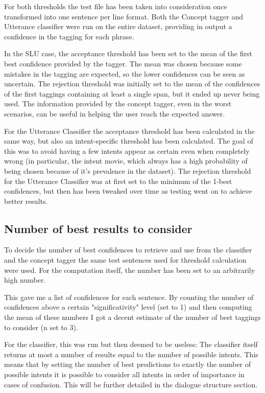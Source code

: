 \documentclass[11pt,a4paper]{article}
\begin{document}
For both thresholds the test file has been taken into consideration once transformed into one sentence per line format.
Both the Concept tagger and Utterance classifier were run on the entire dataset, providing in output a confidence in the tagging for each phrase.

In the SLU case, the acceptance threshold has been set to the mean of the first best confidence provided by the tagger. The mean was chosen because some mistakes in the tagging are expected, so the lower confidences can be seen as uncertain. The rejection threshold was initially set to the mean of the confidences of the first taggings containing at least a single span, but it ended up never being used. The information provided by the concept tagger, even in the worst scenarios, can be useful in helping the user reach the expected answer.

For the Utterance Classifier the acceptance threshold has been calculated in the same way, but also an intent-specific threshold has been calculated. The goal of this was to avoid having a few intents appear as certain even when completely wrong (in particular, the intent movie, which always has a high probability of being chosen because of it's prevalence in the dataset).
The rejection threshold for the Utterance Classifier was at first set to the minimum of the 1-best confidences, but then has been tweaked over time as testing went on to achieve better results.

\subsection{Number of best results to consider}
To decide the number of best confidences to retrieve and use from the classifier and the concept tagger the same test sentences used for threshold calculation were used. For the computation itself, the number has been set to an arbitrarily high number.

This gave me a list of confidences for each sentence.
By counting the number of confidences above a certain "significativity" level (set to 1) and then computing the mean of these numbers I got a decent estimate of the number of best taggings to consider (n set to 3).

For the classifier, this was run but then deemed to be useless: The classifier itself returns at most a number of results equal to the number of possible intents. This means that by setting the number of best predictions to exactly the number of possible intents it is possible to consider all intents in order of importance in cases of confusion. This will be further detailed in the dialogue structure section.
\end{document}
